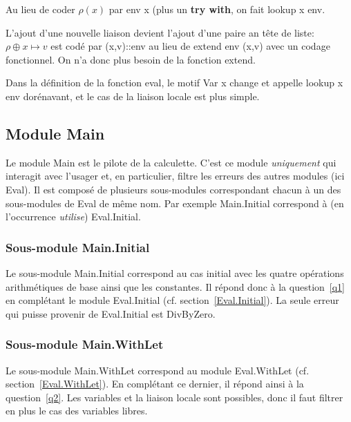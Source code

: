 \documentclass[a4paper,11pt]{article}
\begin{document}
Au lieu de coder $\rho(x)$ par \textsf{env x} (plus un
\textbf{\textsf{try with}}, on fait \textsf{lookup x env}.

L'ajout d'une nouvelle liaison devient l'ajout d'une paire an tête de
liste: $\rho \oplus x \mapsto v$ est codé par \textsf{(x,v)::env} au
lieu de \textsf{extend env (x,v)} avec un codage fonctionnel. On n'a
donc plus besoin de la fonction \textsf{extend}.

Dans la définition de la fonction \textsf{eval}, le motif \textsf{Var
  x} change et appelle \textsf{lookup x env} dorénavant, et le cas de
la liaison locale est plus simple.

\subsection{Module \textsf{Main}}

Le module \textsf{Main} est le pilote de la calculette. C'est ce
module \emph{uniquement} qui interagit avec l'usager et, en
particulier, filtre les erreurs des autres modules (ici
\textsf{Eval}). Il est composé de plusieurs sous-modules correspondant
chacun à un des sous-modules de \textsf{Eval} de même nom. Par exemple
\textsf{Main.Initial} correspond à (en l'occurrence \emph{utilise})
\textsf{Eval.Initial}.



\subsubsection{Sous-module \textsf{Main.Initial}}
\label{Main.Initial}

Le sous-module \textsf{Main.Initial} correspond au cas initial avec
les quatre opérations arithmétiques de base ainsi que les
constantes. Il répond donc à la question~\ref{q1} en complétant le
module \textsf{Eval.Initial} (cf. section~\ref{Eval.Initial}). La
seule erreur qui puisse provenir de \textsf{Eval.Initial} est
\textsf{DivByZero}.

\subsubsection{Sous-module \textsf{Main.WithLet}}
\label{Main.WithLet}

Le sous-module \textsf{Main.WithLet} correspond au module
\textsf{Eval.WithLet} (cf. section~\ref{Eval.WithLet}). En complétant
ce dernier, il répond ainsi à la question~\ref{q2}. Les variables et
la liaison locale sont possibles, donc il faut filtrer en plus le cas
des variables libres.
\end{document}
